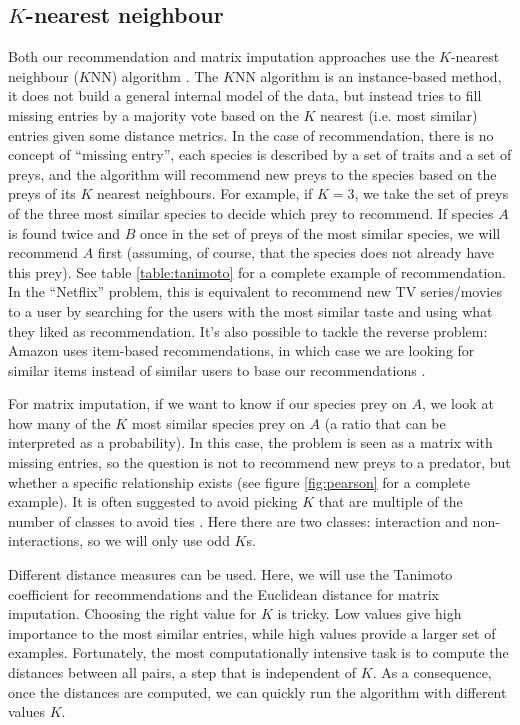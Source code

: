 \documentclass[letterpaper]{article}
\begin{document}
\subsection{$K$-nearest neighbour}

Both our recommendation and matrix imputation approaches use the $K$-nearest
neighbour ($K$NN) algorithm \cite{mur12}. The $K$NN algorithm is an
instance-based method, it does not build a general internal model of the data,
but instead tries to fill missing entries by a majority vote based on the $K$
nearest (i.e. most similar) entries given some distance metrics. In the case of
recommendation, there is no concept of ``missing entry'', each species is
described by a set of traits and a set of preys, and the algorithm will
recommend new preys to the species based on the preys of its $K$ nearest
neighbours. For example, if $K = 3$, we take the set of preys of the three most
similar species to decide which prey to recommend. If species $A$ is found
twice and $B$ once in the set of preys of the most similar species, we will
recommend $A$ first (assuming, of course, that the species does not already
have this prey). See table \ref{table:tanimoto} for a complete example of
recommendation. In the ``Netflix'' problem, this is equivalent to recommend new
TV series/movies to a user by searching for the users with the most similar
taste and using what they liked as recommendation. It's also possible to
tackle the reverse problem: Amazon uses item-based recommendations, in which
case we are looking for similar items instead of similar users to base our
recommendations \cite{agg16}.

For matrix imputation, if we want to know if our species prey on $A$, we look
at how many of the $K$ most similar species prey on $A$ (a ratio that can be
interpreted as a probability). In this case, the problem is seen as a matrix
with missing entries, so the question is not to recommend new preys to a
predator, but whether a specific relationship exists (see figure
\ref{fig:pearson} for a complete example). It is often suggested to avoid
picking $K$ that are multiple of the number of classes to avoid ties
\cite{the15}. Here there are two classes: interaction and non-interactions, so
we will only use odd $K$s.

Different distance measures can be used. Here, we will use the Tanimoto
coefficient for recommendations and the Euclidean distance for matrix
imputation. Choosing the right value for $K$ is tricky. Low values give high
importance to the most similar entries, while high values provide a larger set
of examples. Fortunately, the most computationally intensive task is to compute
the distances between all pairs, a step that is independent of $K$. As a
consequence, once the distances are computed, we can quickly run the algorithm
with different values $K$.
\end{document}
